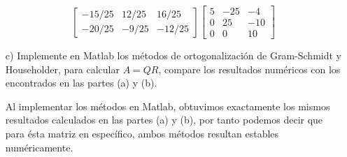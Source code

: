 \begin{enumerate}
\begin{solution}
$$\begin{bmatrix}
                -15/25&12/25&16/25\\
                -20/25&-9/25&-12/25
            \end{bmatrix}\begin{bmatrix}
                5& -25& -4\\
                0& 25& -10\\
                0& 0& 10
            \end{bmatrix}$$
    \end{solution}
    \item[c)] Implemente en Matlab los métodos de ortogonalización de Gram-Schmidt y Householder, para calcular $A = QR$, compare los resultados numéricos con los encontrados en las partes (a) y (b).

    \begin{solution}
    Al implementar los métodos en Matlab, obtuvimos exactamente los mismos resultados calculados en las partes (a) y (b), por tanto podemos decir que para ésta matriz en específico, ambos métodos resultan estables numéricamente.
    \end{solution}
\end{enumerate}